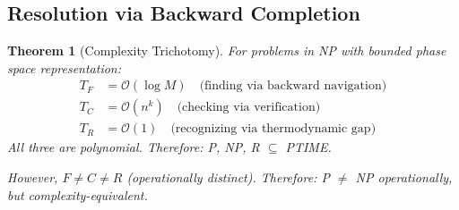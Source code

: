 \documentclass[twocolumn,10pt]{article}
\newtheorem{theorem}{Theorem}[section]
\theoremstyle{definition}
\theoremstyle{remark}
\newcommand{\bigO}{\mathcal{O}}
\begin{document}
\subsection{Resolution via Backward Completion}

\begin{theorem}[Complexity Trichotomy]
\label{thm:pnp_resolution}
For problems in NP with bounded phase space representation:
\begin{align}
T_F &= \bigO(\log M) \quad \text{(finding via backward navigation)} \\
T_C &= \bigO(n^k) \quad \text{(checking via verification)} \\
T_R &= \bigO(1) \quad \text{(recognizing via thermodynamic gap)}
\end{align}
All three are polynomial. Therefore: P, NP, R $\subseteq$ PTIME.

However, $F \neq C \neq R$ (operationally distinct). Therefore: P $\neq$ NP operationally, but complexity-equivalent.
\end{theorem}
\end{document}
